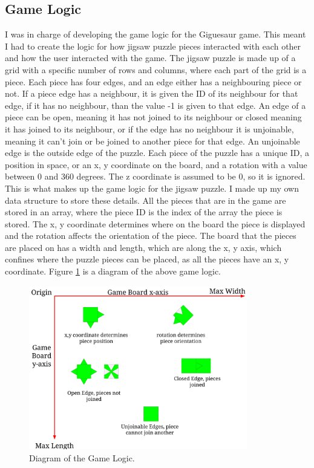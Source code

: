 \documentclass{article}
\begin{document}
\subsection{Game Logic}
I was in charge of developing the game logic for the Giguesaur game. This meant
I had to create the logic for how jigsaw puzzle pieces interacted with each
other and how the user interacted with the game. The jigsaw puzzle is made up of
a grid with a specific number of rows and columns, where each part of the grid
is a piece. Each piece has four edges, and an edge either has a neighbouring
piece or not. If a piece edge has a neighbour, it is given the ID of its
neighbour for that edge, if it has no neighbour, than the value -1 is given to
that edge. An edge of a piece can be open, meaning it has not joined to its
neighbour or closed meaning it has joined to its neighbour, or if the edge has
no neighbour it is unjoinable, meaning it can't join or be joined to another
piece for that edge. An unjoinable edge is the outside edge of the puzzle. Each
piece of the puzzle has a unique ID, a position in space, or an x, y coordinate
on the board, and a rotation with a value between 0 and 360 degrees. The z
coordinate is assumed to be 0, so it is ignored. This is what makes up the game
logic for the jigsaw puzzle. I made up my own data structure to store these
details. All the pieces that are in the game are stored in an array, where the
piece ID is the index of the array the piece is stored. The x, y coordinate
determines where on the board the piece is displayed and the rotation affects
the orientation of the piece. The board that the pieces are placed on has a
width and length, which are along the x, y axis, which confines where the puzzle
pieces can be placed, as all the pieces have an x, y coordinate. Figure
\ref{fig:GameLogic} is a diagram of the above game logic.

\begin{figure}[ht]
\begin{center}
\includegraphics[width=0.85\textwidth, center]{images/GameLogicDiagram}
\caption{Diagram of the Game Logic.}
\label{fig:GameLogic}
\end{center}
\end{figure}
\end{document}
